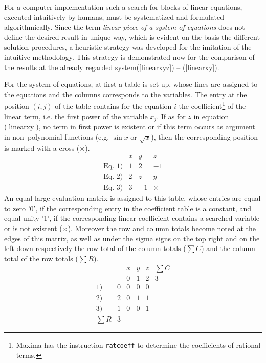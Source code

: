 For a computer implementation such a search for blocks of linear equations, executed intuitively by humans, must be systematized and formulated algorithmically. Since the term {\em linear
piece of a system of equations} does not define the desired result in unique way, which is evident on the basis the different solution procedures, a heuristic strategy was developed for the imitation of the intuitive methodology. This strategy is demonstrated now for the comparison of the results at the already regarded system(\ref{linearxyz}) -- (\ref{linearxy}).

For the system of equations, at first a table is set up, whose lines are assigned to the equations and the columns corresponds to the variables. The entry at the position $(i,j)$ of the table contains for the equation $i$ the coefficient\footnote{Maxima has the instruction {\tt ratcoeff} to determine the coefficients of rational terms.} 
of the linear term, i.e. the first power of the variable  $x_j$. If as for $z$ in equation (\ref{linearxy}), no term in first power is existent or if  this term occurs as argument in non--polynomial  functions (e.g. $\sin x$ or $\sqrt x$), then the corresponding position is marked with a cross ($\times$). 
\begin{displaymath}
\begin{array}{l|rrr}
                         & x &  y &  z \\
\hline
\mbox{Eq.~} 1) & 1 &  2 & -1 \\
\mbox{Eq.~} 2) & 2 &  z &  y \\
\mbox{Eq.~} 3) & 3 & -1 & \times 
\end{array}
\end{displaymath}
An equal large evaluation matrix is assigned to this table, whose entries are equal to zero '0', if the corresponding  entry in the coefficient table is a constant, and equal unity '1', if the corresponding linear coefficient contains a searched variable or is not existent ($\times$). Moreover the row and column totals become noted at the edges of this matrix, as well as under the sigma signs on the top right and on the left down respectively the row total of the column totals ($\sum 
C$) and the column total of the row totals ($\sum R$). 
\begin{equation} \label{linbewmat}
\begin{array}{rr|rrr|c}
       &   & x & y & z & \sum C \\
       &   & 0 & 1 & 2 &      3 \\
\hline
  1)   & 0 & 0 & 0 & 0 &        \\
  2)   & 2 & 0 & 1 & 1 &        \\
  3)   & 1 & 0 & 0 & 1 &        \\
\hline
\sum R & 3 &   &   &   &
\end{array}
\end{equation}
